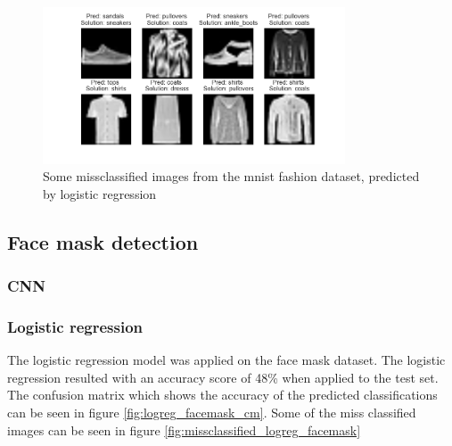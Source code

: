 \documentclass[../main.tex]{subfiles}
\begin{document}
\begin{figure}[H]
    \centering
    \includegraphics[width=0.8\textwidth]{doc/assets/logreg_missclassified_fasion.png}
    \caption{Some missclassified images from the mnist fashion dataset, predicted by logistic regression}
    \label{fig:missclassified_logreg_fashion}
\end{figure}

\subsection{Face mask detection}
\subsubsection{CNN}
\subsubsection{Logistic regression}
The logistic regression model was applied on the face mask dataset. The logistic regression resulted with an accuracy score of 48\% when applied to the test set. The confusion matrix which shows the accuracy of the predicted classifications can be seen in figure \ref{fig:logreg_facemask_cm}. Some of the miss classified images can be seen in figure \ref{fig:missclassified_logreg_facemask}
\end{document}

